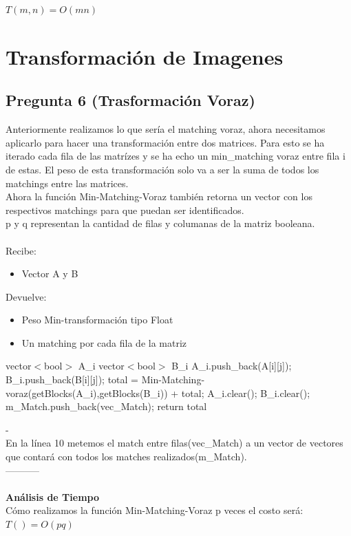 \documentclass{article}
\newcommand{\TITLE}[1]{\item[#1]}
\begin{document}
$T(m,n) = O(mn)$
		\section{Transformación de Imagenes}
		\subsection*{Pregunta 6 (Trasformación Voraz)}
		Anteriormente realizamos lo que sería el matching voraz, ahora necesitamos aplicarlo para hacer una transformación entre dos matrices. Para esto se ha iterado cada fila de las matrízes y se ha echo un min\_matching voraz entre fila i de  estas. El peso de esta transformación solo va a ser la suma de todos los matchings entre las matrices.\\
		Ahora la función Min-Matching-Voraz también retorna un vector con los respectivos matchings para que puedan ser identificados. \\
		p y q representan la cantidad de filas y columanas de la matriz booleana. 
		\\\\
		Recibe:
		\begin{itemize}
			\item Vector A y B
		\end{itemize}
		Devuelve: 
		\begin{itemize}
			\item Peso Min-transformación tipo Float
			\item Un matching por cada fila de la matriz
		\end{itemize}
		\begin{algorithmic}[1]
			\TITLE{\textsc{Transformacion-Voraz}$(A, B)$}
			\STATE vector$<$bool$>$ A\_i
			\STATE vector$<$bool$>$ B\_i
			\STATE A\_i.push\_back(A[i][j]);
			\STATE B\_i.push\_back(B[i][j]);
			\ENDFOR
			\STATE total = Min-Matching-voraz(getBlocks(A\_i),getBlocks(B\_i)) + total;
			\STATE A\_i.clear();
			\STATE B\_i.clear();
			\STATE m\_Match.push\_back(vec\_Match); 
			\STATE return total
			\ENDFOR
		\end{algorithmic}
		-\\
		En la línea 10 metemos el match entre filas(vec\_Match) a un vector de vectores que contará con todos los matches realizados(m\_Match).\\
		-----------\\\\
		\textbf{Análisis de Tiempo}\\
		Cómo realizamos la función Min-Matching-Voraz p veces el costo será:\\ 
		 $T()= O(pq)$
		
\end{document}
